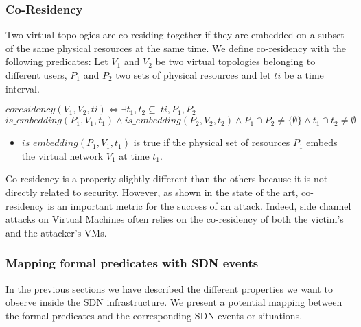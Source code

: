 \subsubsection{Co-Residency}
\label{sec:prop-cores}
Two virtual topologies are co-residing together if they are embedded on a subset of the same physical resources at the same time.
We define co-residency with the following predicates:
Let $V_1$ and $V_2$ be two virtual topologies belonging to different users, $P_1$ and $P_2$ two sets of physical resources and let $ti$ be a time interval.
\begin{myformula}
$coresidency(V_1,V_2,ti) \Leftrightarrow \exists t_1,t_2\subseteq~ti,P_1,P_2$ $is\_embedding(P_1,V_1,t_1) \wedge is\_embedding(P_2,V_2,t_2) \wedge P_1 \cap P_2 \neq \{\emptyset\} \wedge t_1 \cap t_2  \neq \emptyset$
\end{myformula}

\begin{itemize}
    \item $is\_embedding(P_1,V_1,t_1)$ is true if the physical set of resources $P_1$ embeds the virtual network $V_1$ at time $t_1$.
\end{itemize}

Co-residency is a property slightly different than the others because it is not directly related to security.
However, as shown in the state of the art, co-residency is an important metric for the success of an attack.
Indeed, side channel attacks on Virtual Machines often relies on the co-residency of both the victim's and the attacker's VMs.



\subsubsection{Mapping formal predicates with SDN events}
\label{sec:extending-model}
In the previous sections we have described the different properties we want to observe inside the SDN infrastructure.
We present a potential mapping between the formal predicates and the corresponding SDN events or situations.


